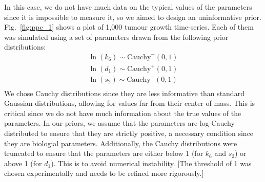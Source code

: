 \documentclass[11pt]{article}
\begin{document}
In this case, we do not have much data on the typical values of the parameters since it is impossible to measure it, so we aimed to design an uninformative prior. Fig.~\ref{fig:ppc_1} shows a plot of 1,000 tumour growth time-series. Each of them was simulated using a set of parameters drawn from the following prior distributions:
\begin{align*}
    \ln(k_6) \sim \text{Cauchy}^-(0, 1) \\ 
    \ln(d_1) \sim \text{Cauchy}^+(0, 1) \\ 
    \ln(s_2) \sim \text{Cauchy}^-(0, 1) \\ 
\end{align*} 
We chose Cauchy distributions since they are less informative than standard Gaussian distributions, allowing for values far from their center of mass. This is critical since we do not have much information about the true values of the parameters. In our priors, we assume that the parameters are log-Cauchy distributed to ensure that they are strictly positive, a necessary condition since they are biologial parameters. Additionally, the Cauchy distributions were truncated to ensure that the parameters are either below 1 (for $k_6$ and $s_2$) or above 1 (for $d_1$). This is to avoid numerical instability. [The threshold of 1 was chosen experimentally and needs to be refined more rigorously.]
\end{document}
